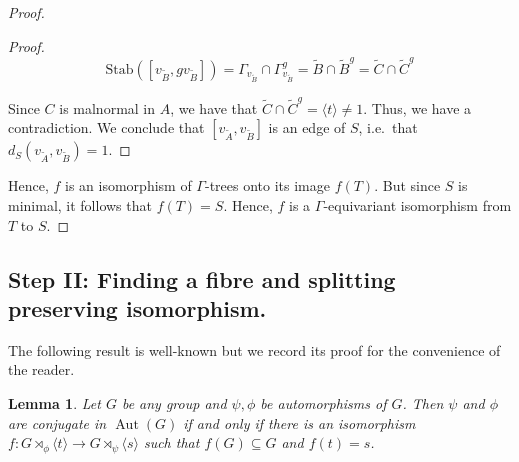\documentclass{amsart}
\DeclareMathOperator{\Aut}{Aut}
\theoremstyle{plain}
\newtheorem{lemma}[thm]{Lemma}
\theoremstyle{definition}
\theoremstyle{remark}
\begin{document}
\begin{proof}
\begin{proof}
    $$\mathrm{Stab}([v_{\tilde{B}}, gv_{\tilde{B}}]) = \Gamma_{v_{\tilde{B}}} \cap \Gamma_{v_{\tilde{B}}}^g = \tilde{B} \cap \tilde{B}^g = \tilde{C} \cap \tilde{C}^g$$

    Since $C$ is malnormal in $A$, we have that $\tilde{C} \cap \tilde{C}^g = \langle t \rangle \neq 1$. Thus, we have a contradiction. We conclude that $[v_{\tilde{A}}, v_{\tilde{B}}]$ is an edge of $S$, i.e.\ that $d_S(v_{\tilde{A}}, v_{\tilde{B}}) = 1$. 
    \end{proof}
    
    Hence, $f$ is an isomorphism of $\Gamma$-trees onto its image $f(T)$. But since $S$ is minimal, it follows that $f(T) = S$. Hence, $f$ is a $\Gamma$-equivariant isomorphism from $T$ to $S$.
    
    
    
    
\end{proof}


\subsection{Step II: Finding a fibre and splitting preserving isomorphism.}
The following result is well-known but we record its proof for the convenience of the reader. 

\begin{lemma}
\label{lem:mapping_tori_iso_implies_conjuguate}
Let $G$ be any group and $\psi, \phi$ be automorphisms of $G$. Then $\psi$ and $\phi$ are conjugate in $\Aut(G)$ if and only if there is an isomorphism $f: G \rtimes_{\phi} \langle t \rangle \to G \rtimes_{\psi} \langle s \rangle$ such that $f(G) \subseteq G$ and $f(t)=s$.
\end{lemma}
\end{document}
